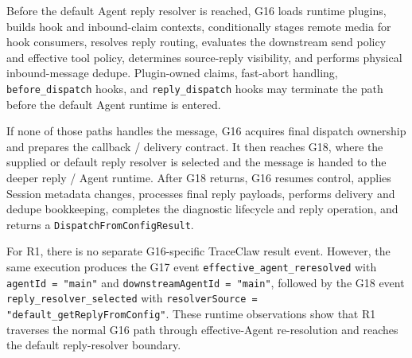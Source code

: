 Before the default Agent reply resolver is reached, G16 loads runtime
plugins, builds hook and inbound-claim contexts, conditionally stages
remote media for hook consumers, resolves reply routing, evaluates the
downstream send policy and effective tool policy, determines
source-reply visibility, and performs physical inbound-message dedupe.
Plugin-owned claims, fast-abort handling, \texttt{before\_dispatch}
hooks, and \texttt{reply\_dispatch} hooks may terminate the path before
the default Agent runtime is entered.

If none of those paths handles the message, G16 acquires final dispatch
ownership and prepares the callback / delivery contract. It then
reaches G18, where the supplied or default reply resolver is selected
and the message is handed to the deeper reply / Agent runtime.
After G18 returns, G16 resumes control, applies Session metadata
changes, processes final reply payloads, performs delivery and dedupe
bookkeeping, completes the diagnostic lifecycle and reply operation,
and returns a \texttt{DispatchFromConfigResult}.

For R1, there is no separate G16-specific TraceClaw result event.
However, the same execution produces the G17 event
\texttt{effective\_agent\_reresolved} with
\texttt{agentId = "main"} and
\texttt{downstreamAgentId = "main"}, followed by the G18 event
\texttt{reply\_resolver\_selected} with
\texttt{resolverSource = "default\_getReplyFromConfig"}. These runtime
observations show that R1 traverses the normal G16 path through
effective-Agent re-resolution and reaches the default reply-resolver
boundary.

